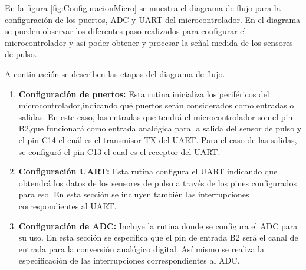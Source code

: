 En la figura \ref{fig:ConfiguracionMicro} se muestra el diagrama de flujo para la configuración de los puertos, ADC y UART del microcontrolador. En el diagrama se pueden observar los diferentes paso realizados para configurar el microcontrolador y así poder obtener y procesar la señal medida de los sensores de pulso.

A continuación se describen las etapas del diagrama de flujo.

\begin{enumerate}
	\item \textbf{Configuración de puertos:} Esta rutina inicializa los periféricos del microcontrolador,indicando qué puertos serán considerados como entradas o salidas. En este caso, las entradas que tendrá el microcontrolador son el pin B2,que funcionará como entrada analógica para la salida del sensor de pulso y el pin C14 el cuál es el transmisor TX del UART. Para el caso de las salidas, se configuró el pin C13 el cual es el receptor del UART. 
	
	
	
	\item \textbf{Configuración UART:} Esta rutina configura el UART indicando que obtendrá los datos de los sensores de pulso a través de los pines configurados para eso. En esta sección se incluyen también las interrupciones correspondientes al UART.
	
	\item \textbf{Configuración de ADC:} Incluye la rutina donde se configura el ADC para su uso. En esta sección se especifica que el pin de entrada B2 será el canal de entrada para la conversión analógico digital. Así mismo se realiza la especificación de las interrupciones correspondientes al ADC.
	
\end{enumerate}

